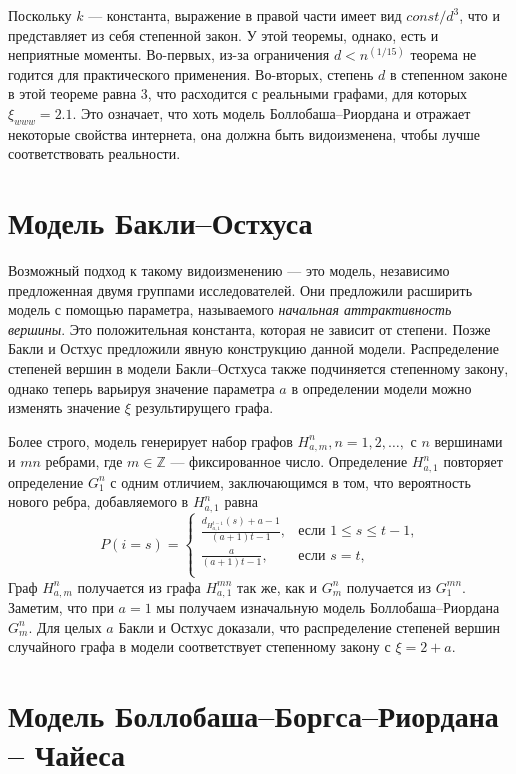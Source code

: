 \documentclass[14pt]{extreport}
\begin{document}
Поскольку $k$ --- константа, выражение в правой части имеет вид $const / d^3$, что и представляет из себя степенной закон.
У этой теоремы, однако, есть и неприятные моменты. Во-первых, из-за ограничения $d < n^{(1/15)}$ теорема не годится для практического применения. Во-вторых, степень $d$ в степенном законе в этой теореме равна 3, что расходится с реальными графами, для которых $\xi_{www}=2.1$. Это означает, что хоть модель Боллобаша--Риордана и отражает некоторые свойства интернета, она должна быть видоизменена, чтобы лучше соответствовать реальности.

\section{Модель Бакли--Остхуса}

Возможный подход к такому видоизменению --- это модель, независимо предложенная двумя группами исследователей. Они предложили расширить модель с помощью параметра, называемого {\it начальная аттрактивность вершины}. Это положительная константа, которая не зависит от степени. Позже Бакли и Остхус предложили явную конструкцию данной модели. Распределение степеней вершин в модели Бакли--Остхуса также подчиняется степенному закону, однако теперь варьируя значение параметра $a$ в определении модели можно изменять значение $\xi$ результирущего графа\cite{book2}.

Более строго, модель генерирует набор графов $H_{a, m}^n, n=1, 2,\dots,$ с $n$ вершинами и $mn$ ребрами, где $m \in \mathbb{Z}$ --- фиксированное число. Определение $H_{a, 1}^n$ повторяет определение $G_1^n$ с одним отличием, заключающимся в том, что вероятность нового ребра, добавляемого в $H_{a, 1}^n$ равна
$$  
P(i=s) =
\begin{cases}  
  \frac{d_{H_{a, 1}^{t-1}}(s)+a-1}{(a+1)t-1},&\text{если $1 \leqslant s \leqslant t-1$,}\\
  \frac{a}{(a+1)t-1},&\text{если $s=t$,}\\
\end{cases}
$$  
Граф $H_{a, m}^n$ получается из графа $H_{a, 1}^{mn}$ так же, как и $G_m^n$ получается из $G_1^{mn}$. Заметим, что при $a=1$ мы получаем изначальную модель Боллобаша--Риордана $G_m^n$. Для целых $a$ Бакли и Остхус доказали, что распределение степеней вершин случайного графа в модели соответствует степенному закону с $\xi = 2 + a$.
 
\section{Модель Боллобаша--Боргса--Риордана -- Чайеса}
\end{document}
